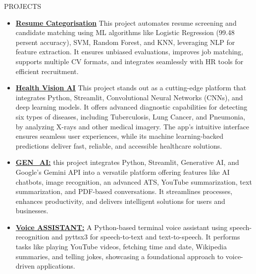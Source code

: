 \documentclass{resume}
\begin{document}
\begin{rSection}{PROJECTS}
    \begin{itemize}
        \item \textbf{\href{https://github.com}{Resume Categorisation}} {This project automates resume screening and candidate matching using ML algorithms like Logistic Regression (99.48 persent accuracy), SVM, Random Forest, and KNN, leveraging NLP for feature extraction. It ensures unbiased evaluations, improves job matching, supports multiple CV formats, and integrates seamlessly with HR tools for efficient recruitment.}
        \vspace{-0.2em}
        \item \textbf{\href{https://github.com}{Health Vision AI}} {This project stands out as a cutting-edge platform that integrates Python, Streamlit, Convolutional Neural Networks (CNNs), and deep learning models. It offers advanced diagnostic capabilities for detecting six types of diseases, including Tuberculosis, Lung Cancer, and Pneumonia, by analyzing X-rays and other medical imagery. The app's intuitive interface ensures seamless user experiences, while its machine learning-backed predictions deliver fast, reliable, and accessible healthcare solutions.}
        \vspace{-0.2em}
        \item \textbf{\href{https://github.com/trishaamandal/Gen-AI}{GEN\_AI:}} {this project integrates Python, Streamlit, Generative AI, and Google’s Gemini API into a versatile platform offering features like AI chatbots, image recognition, an advanced ATS, YouTube summarization, text summarization, and PDF-based conversations. It streamlines processes, enhances productivity, and delivers intelligent solutions for users and businesses.
        }
        \vspace{-0.2em}
        \item \textbf{\href{https://github.com/trishaamandal/VoiceAssistent}{Voice ASSISTANT:}} {A Python-based terminal voice assistant using speech-recognition and pyttsx3 for speech-to-text and text-to-speech. It performs tasks like playing YouTube videos, fetching time and date, Wikipedia summaries, and telling jokes, showcasing a foundational approach to voice-driven applications.}
        \vspace{-0.2em}
    \end{itemize}
\end{rSection}
\vspace{-0.4em}
\end{document}

